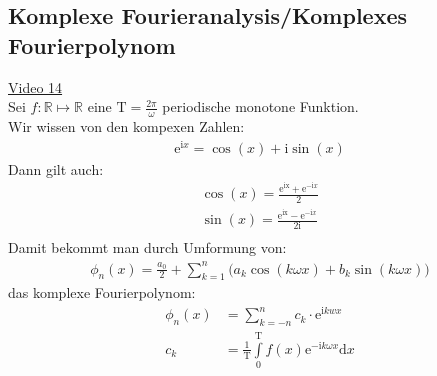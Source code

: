 \subsection{Komplexe Fourieranalysis/Komplexes Fourierpolynom}
\href{https://youtu.be/dZAkPwv7v28}{Video 14}\\
Sei $ f:\mathbb{R}\longmapsto \mathbb{R} $ eine $ \mathrm{T}=\frac{2\pi}{\omega} $ periodische monotone Funktion.\\
Wir wissen von  den kompexen Zahlen:\\
\begin{align*}
\mathrm{e}^{\mathrm{i}x}=\cos(x)+\mathrm{i}\sin(x)
\end{align*}
Dann gilt auch:\\
\begin{align*}
\cos(x)=\frac{\mathrm{e}^{\mathrm{ix}}+\mathrm{e}^{-\mathrm{i}x}}{2}\\
\sin(x)=\frac{\mathrm{e}^{\mathrm{ix}}-\mathrm{e}^{-\mathrm{i}x}}{2\mathrm{i}}\\
\end{align*}
Damit bekommt man durch Umformung von:\\
\begin{align*}
\phi_n(x)=\frac{a_0}{2}+\sum\limits_{k=1}^{n}\big(a_k\cos(k\omega x)+b_k\sin(k\omega x)\big)
\end{align*}
das komplexe Fourierpolynom:\\
\begin{align*}
\phi_n(x)&=\sum\limits_{k=-n}^{n}c_k\cdot \mathrm{e}^{\mathrm{i}kwx}\\
c_k&=\frac{1}{\mathrm{T}}\int\limits_{0}^{\mathrm{T}} f(x)\mathrm{e}^{-\mathrm{i}k\omega x}\mathrm{d}x
\end{align*}
